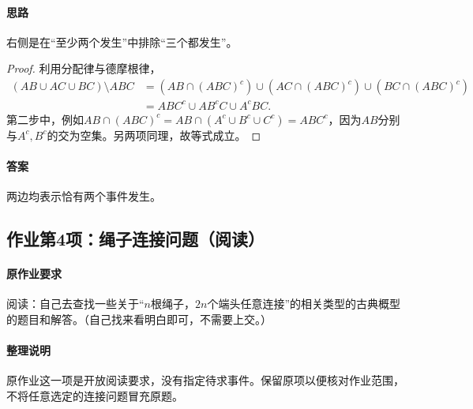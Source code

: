 \paragraph{思路}右侧是在“至少两个发生”中排除“三个都发生”。
\begin{proof}
利用分配律与德摩根律，
\begin{align*}
(AB\cup AC\cup BC)\setminus ABC
&=(AB\cap(ABC)^c)\cup(AC\cap(ABC)^c)\cup(BC\cap(ABC)^c)\\
&=ABC^c\cup AB^cC\cup A^cBC.
\end{align*}
第二步中，例如$AB\cap(ABC)^c=AB\cap(A^c\cup B^c\cup C^c)=ABC^c$，因为$AB$分别与$A^c,B^c$的交为空集。另两项同理，故等式成立。
\end{proof}
\paragraph{答案}两边均表示恰有两个事件发生。

\subsection{作业第4项：绳子连接问题（阅读）}\label{ex:w01-h4}
\paragraph{原作业要求}
阅读：自己去查找一些关于“$n$根绳子，$2n$个端头任意连接”的相关类型的古典概型的题目和解答。（自己找来看明白即可，不需要上交。）
\paragraph{整理说明}原作业这一项是开放阅读要求，没有指定待求事件。保留原项以便核对作业范围，不将任意选定的连接问题冒充原题。
